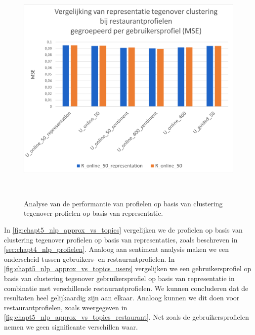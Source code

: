 \begin{figure}[H]
        \centering
        \parbox[b]{0.6\textwidth}{\includegraphics[width=\linewidth]{fig/chapt5/NLP/nlp_comparison_approx_restaurant.png}}\quad
        \parbox[b]{0.37\textwidth}{
        \label{fig:chapt5_nlp_approx_vs_topics_restaurant}}
        \\[.5cm]

        \caption{Analyse van de performantie van profielen op basis van clustering tegenover profielen op basis van representatie.}
        \label{fig:chapt5_nlp_approx_vs_topics}
\end{figure}

In \autoref{fig:chapt5_nlp_approx_vs_topics} vergelijken we de profielen op basis van clustering tegenover profielen op basis van representaties, zoals beschreven in \autoref{sec:chapt4_nlp_profielen}. Analoog aan sentiment analysis maken we een onderscheid tussen gebruikers- en restaurantprofielen. In \autoref{fig:chapt5_nlp_approx_vs_topics_users} vergelijken we een gebruikersprofiel op basis van clustering tegenover gebruikersprofiel op basis van representatie in combinatie met verschillende restaurantprofielen. We kunnen concluderen dat de resultaten heel gelijkaardig zijn aan elkaar. Analoog kunnen we dit doen voor restaurantprofielen, zoals weergegeven in \autoref{fig:chapt5_nlp_approx_vs_topics_restaurant}. Net zoals de gebruikersprofielen nemen we geen significante verschillen waar. 


